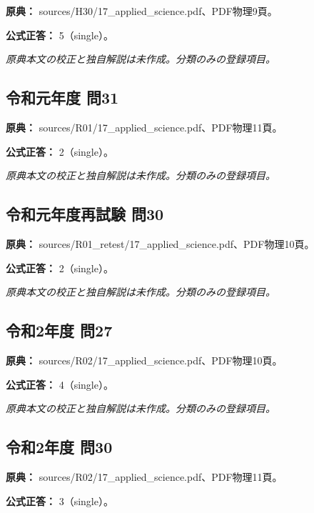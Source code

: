 \noindent\textbf{原典：} sources/H30/17\_applied\_science.pdf、PDF物理9頁。

\textbf{公式正答：} 5（single）。

\par\textit{原典本文の校正と独自解説は未作成。分類のみの登録項目。}

\subsection{令和元年度 問31}
\label{q:r01-reg-applied-31}

\noindent\textbf{原典：} sources/R01/17\_applied\_science.pdf、PDF物理11頁。

\textbf{公式正答：} 2（single）。

\par\textit{原典本文の校正と独自解説は未作成。分類のみの登録項目。}

\subsection{令和元年度再試験 問30}
\label{q:r01-ret-applied-30}

\noindent\textbf{原典：} sources/R01\_retest/17\_applied\_science.pdf、PDF物理10頁。

\textbf{公式正答：} 2（single）。

\par\textit{原典本文の校正と独自解説は未作成。分類のみの登録項目。}

\subsection{令和2年度 問27}
\label{q:r02-reg-applied-27}

\noindent\textbf{原典：} sources/R02/17\_applied\_science.pdf、PDF物理10頁。

\textbf{公式正答：} 4（single）。

\par\textit{原典本文の校正と独自解説は未作成。分類のみの登録項目。}

\subsection{令和2年度 問30}
\label{q:r02-reg-applied-30}

\noindent\textbf{原典：} sources/R02/17\_applied\_science.pdf、PDF物理11頁。

\textbf{公式正答：} 3（single）。

